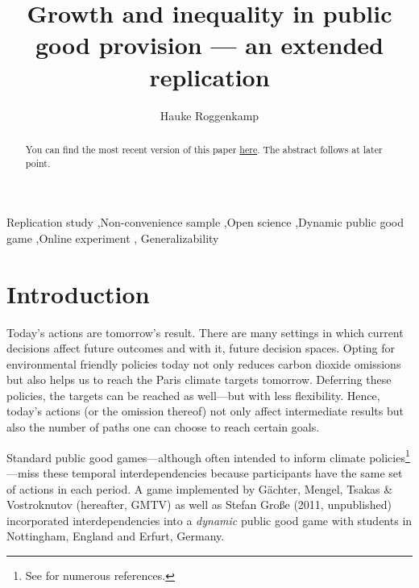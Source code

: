 \documentclass[
  authoryear,
  preprint,
  3p]{elsarticle}
\begin{document}
\begin{frontmatter}
\title{Growth and inequality in public good provision --- an extended
replication}
\author[1,2]{Hauke Roggenkamp%
%
}



        
\begin{abstract}
You can find the most recent version of this paper
\href{https://github.com/Howquez/coopUncertainty/blob/main/analysis/quarto/paper.pdf}{here}.
The abstract follows at later point.
\end{abstract}





\begin{keyword}
    Replication study \sep Non-convenience sample \sep Open
science \sep Dynamic public good game \sep Online experiment \sep 
    Generalizability
\end{keyword}
\end{frontmatter}\ifdefined\Shaded\renewenvironment{Shaded}{\begin{tcolorbox}[interior hidden, frame hidden, sharp corners, enhanced, breakable, boxrule=0pt, borderline west={3pt}{0pt}{shadecolor}]}{\end{tcolorbox}}\fi

\hypertarget{sec-intro}{%
\section{Introduction}\label{sec-intro}}

Today's actions are tomorrow's result. There are many settings in which
current decisions affect future outcomes and with it, future decision
spaces. Opting for environmental friendly policies today not only
reduces carbon dioxide omissions but also helps us to reach the Paris
climate targets tomorrow. Deferring these policies, the targets can be
reached as well---but with less flexibility. Hence, today's actions (or
the omission thereof) not only affect intermediate results but also the
number of paths one can choose to reach certain goals.

Standard public good games---although often intended to inform climate
policies\footnote{See \citet[p.~1]{GKLS2020} for numerous references.}---miss
these temporal interdependencies because participants have the same set
of actions in each period. A game implemented by Gächter, Mengel, Tsakas
\& Vostroknutov \citeyearpar{GMTV2017} (hereafter, GMTV) as well as
Stefan Große (2011, unpublished) incorporated interdependencies into a
\emph{dynamic} public good game with students in Nottingham, England and
Erfurt, Germany.
\end{document}
